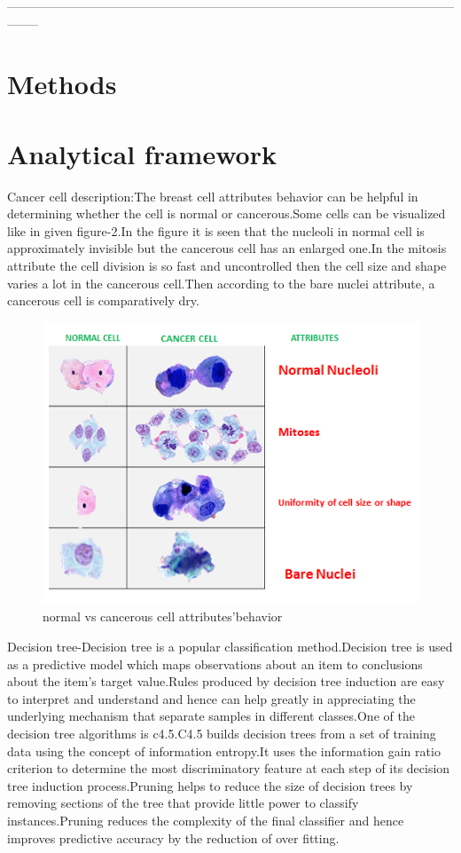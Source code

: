 \documentclass[11pt]{article}
\begin{document}
 --------------------------------------------------------------------------------------------------------------------
\section{Methods}




\section{Analytical framework}
Cancer cell description:The breast cell attributes behavior can be helpful in determining whether the cell is normal or cancerous.Some cells can be visualized like in given figure-2.In the figure it is seen that the nucleoli in normal cell is approximately invisible but the cancerous cell has an enlarged one.In the mitosis attribute the cell division is so fast and uncontrolled then the cell size and shape varies a lot in the cancerous cell.Then according to the bare nuclei attribute, a cancerous cell is comparatively dry.  
\begin{figure}[!h]
\centering
\includegraphics[scale=0.7]{attri}
\caption{normal vs cancerous cell attributes'behavior}
\label{fig_sin}

\end{figure}
Decision tree-Decision tree is a popular classification method.Decision tree is used as a predictive model which maps observations about an item to conclusions about the item's target value.Rules produced by decision tree induction are easy to interpret and understand and hence can help greatly in appreciating the underlying mechanism that separate samples in different classes.One of the decision tree algorithms is c4.5.C4.5 builds decision trees from a set of training data using the concept of information entropy.It uses the information gain ratio criterion to determine the most discriminatory feature at each step of its  decision tree induction process.Pruning helps to reduce the size of decision trees by removing sections of the tree that provide little power to classify instances.Pruning reduces the complexity of the final classifier and hence improves predictive accuracy by the reduction of over fitting.
\end{document}
